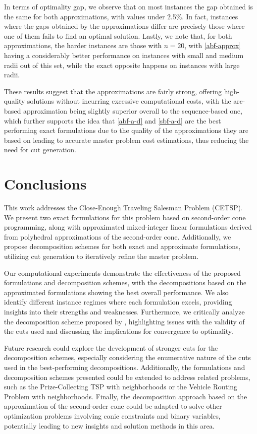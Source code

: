 \documentclass[pdflatex,sn-mathphys-num]{sn-jnl}%
\begin{document}
In terms of optimality gap, we observe that on most instances the gap obtained is the same for both approximations, with values under 2.5\%. In fact, instances where the gaps obtained by the approximations differ are precisely those where one of them fails to find an optimal solution. Lastly, we note that, for both approximations, the harder instances are those with $n=20$, with \ref{abf-approx} having a considerably better performance on instances with small and medium radii out of this set, while the exact opposite happens on instances with large radii.

These results suggest that the approximations are fairly strong, offering high-quality solutions without incurring excessive computational costs, with the arc-based approximation being slightly superior overall to the sequence-based one, which further supports the idea that \ref{abf-a-d} and \ref{sbf-a-d} are the best performing exact formulations due to the quality of the approximations they are based on leading to accurate master problem cost estimations, thus reducing the need for cut generation.


\section{Conclusions}\label{sec8}

This work addresses the Close-Enough Traveling Salesman Problem (CETSP). We present two exact formulations for this problem based on second-order cone programming, along with approximated mixed-integer linear formulations derived from polyhedral approximations of the second-order cone. Additionally, we propose decomposition schemes for both exact and approximate formulations, utilizing cut generation to iteratively refine the master problem. 

Our computational experiments demonstrate the effectiveness of the proposed formulations and decomposition schemes, with the decompositions based on the approximated formulations showing the best overall performance. We also identify different instance regimes where each formulation excels, providing insights into their strengths and weaknesses. Furthermore, we critically analyze the decomposition scheme proposed by \citet{walteros}, highlighting issues with the validity of the cuts used and discussing the implications for convergence to optimality.

Future research could explore the development of stronger cuts for the decomposition schemes, especially considering the enumerative nature of the cuts used in the best-performing decompositions. Additionally, the formulations and decomposition schemes presented could be extended to address related problems, such as the Prize-Collecting TSP with neighborhoods or the Vehicle Routing Problem with neighborhoods. Finally, the decomposition approach based on the approximation of the second-order cone could be adapted to solve other optimization problems involving conic constraints and binary variables, potentially leading to new insights and solution methods in this area.
\end{document}
